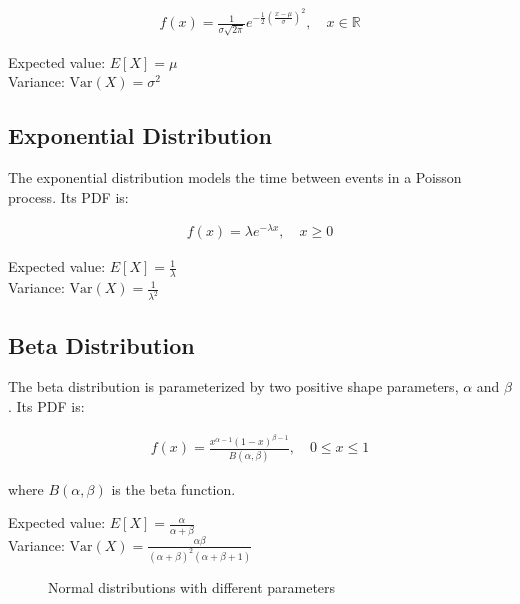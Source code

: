 \documentclass[12pt,a4paper]{article}
\begin{document}
\begin{align}
f(x) = \frac{1}{\sigma\sqrt{2\pi}} e^{-\frac{1}{2}\left(\frac{x-\mu}{\sigma}\right)^2}, \quad x \in \mathbb{R}
\end{align}

Expected value: $E[X] = \mu$\\
Variance: $\text{Var}(X) = \sigma^2$

\subsection{Exponential Distribution}
The exponential distribution models the time between events in a Poisson process. Its PDF is:

\begin{align}
f(x) = \lambda e^{-\lambda x}, \quad x \geq 0
\end{align}

Expected value: $E[X] = \frac{1}{\lambda}$\\
Variance: $\text{Var}(X) = \frac{1}{\lambda^2}$

\subsection{Beta Distribution}
The beta distribution is parameterized by two positive shape parameters, $\alpha$ and $\beta$. Its PDF is:

\begin{align}
f(x) = \frac{x^{\alpha-1}(1-x)^{\beta-1}}{B(\alpha, \beta)}, \quad 0 \leq x \leq 1
\end{align}

where $B(\alpha, \beta)$ is the beta function.

Expected value: $E[X] = \frac{\alpha}{\alpha+\beta}$\\
Variance: $\text{Var}(X) = \frac{\alpha\beta}{(\alpha+\beta)^2(\alpha+\beta+1)}$

\begin{figure}[h]
\centering
{}
\caption{Normal distributions with different parameters}
\end{figure}
\end{document}

